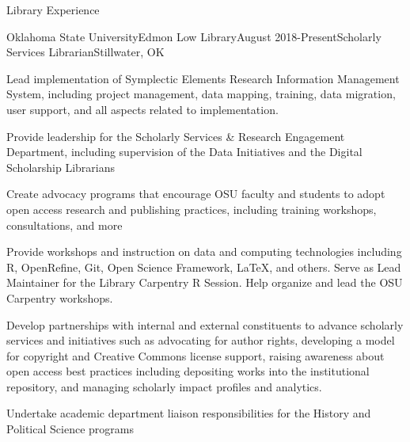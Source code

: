 \documentclass{resume} %
\begin{document}
\begin{rSection}{Library Experience}
\raggedright

\begin{rSubsection}{Oklahoma State University}{Edmon Low Library}{August 2018-Present}{Scholarly Services Librarian}{Stillwater, OK}
\item Lead implementation of Symplectic Elements Research Information Management System, including project management, data mapping, training, data migration, user support, and all aspects related to implementation.
\item Provide leadership for the Scholarly Services \& Research Engagement Department, including supervision of the Data Initiatives and the Digital Scholarship Librarians
\item Create advocacy programs that encourage OSU faculty and students to adopt open access research and publishing practices, including training workshops, consultations, and more
\item Provide workshops and instruction on data and computing technologies including R, OpenRefine, Git, Open Science Framework, \LaTeX, and others. Serve as Lead Maintainer for the Library Carpentry R Session. Help organize and lead the OSU Carpentry workshops. 
\item Develop partnerships with internal and external constituents to advance scholarly services and initiatives such as advocating for author rights, developing a model for copyright and Creative Commons license support, raising awareness about open access best practices including depositing works into the institutional repository, and managing scholarly impact profiles and analytics.
\item Undertake academic department liaison responsibilities for the History and Political Science programs
\end{rSubsection}

\pagebreak


\end{rSection}
\end{document}
